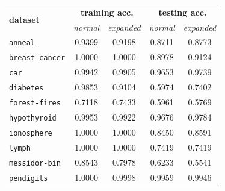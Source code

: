 \documentclass[12pt]{report}
\theoremstyle{definition}
\theoremstyle{definition}
\theoremstyle{definition}
\begin{document}
\begin{table}[ht]
    \centering
    \begin{tabular}{lcccc}
    \hline
    \multicolumn{1}{l}{\multirow{2}{*}{\bf dataset}} & \multicolumn{2}{c}{\bf training acc.} & \multicolumn{2}{c}{\bf testing acc.} \\
    \multicolumn{1}{l}{} & \multicolumn{1}{p{2cm}}{\centering \it normal} & \multicolumn{1}{p{2cm}}{\centering \it expanded} & \multicolumn{1}{p{2cm}}{\centering \it normal} & \multicolumn{1}{p{2cm}}{\centering \it expanded} \\
    \hline
    \multicolumn{1}{l}{\tt anneal}        & \multicolumn{1}{c}{0.9399} & \multicolumn{1}{c}{0.9198} & \multicolumn{1}{c}{0.8711} & \multicolumn{1}{c}{0.8773} \\
    \multicolumn{1}{l}{\tt breast-cancer} & \multicolumn{1}{c}{1.0000} & \multicolumn{1}{c}{1.0000} & \multicolumn{1}{c}{0.8978} & \multicolumn{1}{c}{0.9124} \\
    \multicolumn{1}{l}{\tt car}           & \multicolumn{1}{c}{0.9942} & \multicolumn{1}{c}{0.9905} & \multicolumn{1}{c}{0.9653} & \multicolumn{1}{c}{0.9739} \\
    \multicolumn{1}{l}{\tt diabetes}      & \multicolumn{1}{c}{0.9853} & \multicolumn{1}{c}{0.9104} & \multicolumn{1}{c}{0.5974} & \multicolumn{1}{c}{0.7402} \\
    \multicolumn{1}{l}{\tt forest-fires}  & \multicolumn{1}{c}{0.7118} & \multicolumn{1}{c}{0.7433} & \multicolumn{1}{c}{0.5961} & \multicolumn{1}{c}{0.5769} \\
    \multicolumn{1}{l}{\tt hypothyroid}   & \multicolumn{1}{c}{0.9953} & \multicolumn{1}{c}{0.9922} & \multicolumn{1}{c}{0.9676} & \multicolumn{1}{c}{0.9784} \\
    \multicolumn{1}{l}{\tt ionosphere}    & \multicolumn{1}{c}{1.0000} & \multicolumn{1}{c}{1.0000} & \multicolumn{1}{c}{0.8450} & \multicolumn{1}{c}{0.8591} \\
    \multicolumn{1}{l}{\tt lymph}         & \multicolumn{1}{c}{1.0000} & \multicolumn{1}{c}{1.0000} & \multicolumn{1}{c}{0.7419} & \multicolumn{1}{c}{0.7419} \\
    \multicolumn{1}{l}{\tt messidor-bin}  & \multicolumn{1}{c}{0.8543} & \multicolumn{1}{c}{0.7978} & \multicolumn{1}{c}{0.6233} & \multicolumn{1}{c}{0.5541} \\
    \multicolumn{1}{l}{\tt pendigits}     & \multicolumn{1}{c}{1.0000} & \multicolumn{1}{c}{0.9998} & \multicolumn{1}{c}{0.9959} & \multicolumn{1}{c}{0.9946} \\

\end{tabular}
\end{table}
\end{document}
